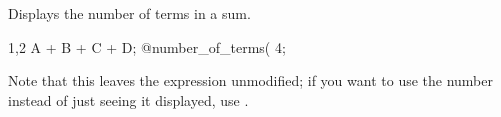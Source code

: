
Displays the number of terms in a sum.
\begin{screen}{1,2}
A + B + C + D;
@number_of_terms(%
4;
\end{screen}
Note that this leaves the expression unmodified; if you want to use
the number instead of just seeing it displayed,
use .

